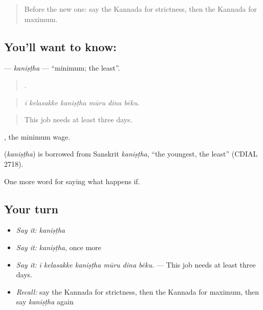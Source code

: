 \label{lesson:KA-C414-kanistha}



\begin{quote}
Before the new one: say the Kannada for strictness, then the Kannada for maximum.
\end{quote}

\subsection*{You'll want to know: }
\textbf{} — \emph{kaniṣṭha} — \textquotedblleft{}minimum; the least\textquotedblright{}.

\begin{quote}
     .
\end{quote}

\begin{quote}
\emph{ī kelasakke kaniṣṭha mūru dina bēku.}
\end{quote}

\begin{quote}
This job needs at least three days.
\end{quote}

 , the minimum wage.

\begin{cousinweb}
\textbf{} (\emph{kaniṣṭha}) is borrowed from Sanskrit \emph{kaniṣṭha}, \textquotedblleft{}the youngest, the least\textquotedblright{} (CDIAL 2718).
\end{cousinweb}

\begin{grammarlens}[title={What you've built}]
One more word for saying what happens if.
\end{grammarlens}

\subsection*{Your turn}
\begin{itemize}
\raggedright
  \item \emph{Say it:} \emph{kaniṣṭha}
  \item \emph{Say it:} \emph{kaniṣṭha}, once more
  \item \emph{Say it:} \emph{ī kelasakke kaniṣṭha mūru dina bēku.} — This job needs at least three days.
  \item \emph{Recall:} say the Kannada for strictness, then the Kannada for maximum, then say \emph{kaniṣṭha} again
\end{itemize}


